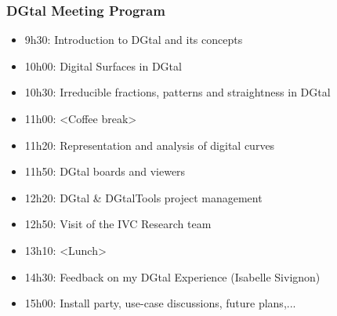 \documentclass[8pt]{beamer}
\begin{document}
\begin{frame}
  \frametitle{DGtal Meeting Program}
  
  \begin{itemize}
  \item 9h30: Introduction to DGtal and its concepts
  \item 10h00: Digital Surfaces in DGtal
  \item 10h30: Irreducible fractions, patterns and straightness in DGtal
    
  \item 11h00: <Coffee break>
    
  \item 11h20: Representation and analysis of digital curves
   \item 11h50: DGtal boards and viewers
   \item 12h20: DGtal & DGtalTools project management
   \item 12h50: Visit of the IVC Research team
     
   \item 13h10: <Lunch>
     
   \item 14h30: Feedback on my DGtal Experience (Isabelle Sivignon)
   \item 15h00: Install party, use-case discussions, future plans,...
  \end{itemize}
 \end{frame}
\end{document}
